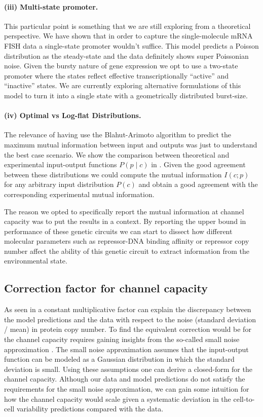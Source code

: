 \paragraph{(iii) Multi-state promoter.}
This particular point is something that we are still exploring from a
theoretical perspective. We have shown that in order to capture the
single-molecule mRNA FISH data a single-state promoter wouldn't suffice. This
model predicts a Poisson distribution as the steady-state and the data
definitely shows super Poissonian noise. Given the bursty nature of gene
expression we opt to use a two-state promoter where the states reflect
effective transcriptionally ``active'' and ``inactive'' states. We are
currently exploring alternative formulations of this model to turn it into a
single state with a geometrically distributed burst-size.

\paragraph{(iv) Optimal vs Log-flat Distributions.}
The relevance of having use the Blahut-Arimoto algorithm to predict the maximum
mutual information between input and outputs was just to understand the best
case scenario. We show the comparison between theoretical and experimental
input-output functions $P(p \mid c)$ in . Given the good
agreement between these distributions we could compute the mutual information
$I(c; p)$ for any arbitrary input distribution $P(c)$ and obtain a good
agreement with the corresponding experimental mutual information.

The reason we opted to specifically report the mutual information at channel
capacity was to put the results in a context. By reporting the upper bound in
performance of these genetic circuits we can start to dissect how different
molecular parameters such as repressor-DNA binding affinity or repressor copy
number affect the ability of this genetic circuit to extract information from
the environmental state.

\subsection{Correction factor for channel capacity}

As seen in  a constant multiplicative factor can explain
the discrepancy between the model predictions and the data with respect to the
noise (standard deviation / mean) in protein copy number. To find the
equivalent correction would be for the channel capacity requires gaining
insights from the so-called small noise approximation \cite{Tkacik2008a}. The
small noise approximation assumes that the input-output function can be modeled
as a Gaussian distribution in which the standard deviation is small. Using
these assumptions one can derive a closed-form for the channel capacity.
Although our data and model predictions do not satisfy the requirements for the
small noise approximation, we can gain some intuition for how the channel
capacity would scale given a systematic deviation in the cell-to-cell
variability predictions compared with the data.

